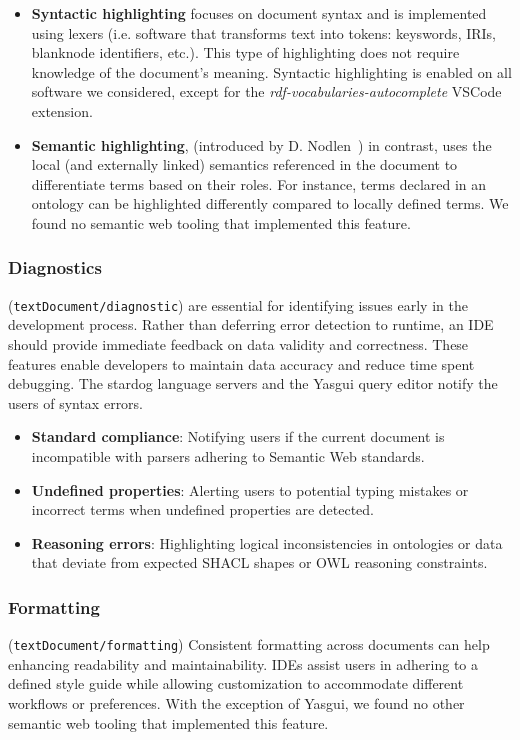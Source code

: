 \begin{itemize}
    \item \textbf{Syntactic highlighting} focuses on document syntax and is implemented using lexers (i.e. software that transforms text into tokens: keyswords, IRIs, blanknode identifiers, etc.).
      This type of highlighting does not require knowledge of the document's meaning.
      Syntactic highlighting is enabled on all software we considered, except for the 
      \textit{rdf-vocabularies-autocomplete} VSCode extension.
    \item \textbf{Semantic highlighting}, (introduced by D. Nodlen~\cite{DNolden}) in contrast, uses the local (and externally linked) semantics referenced in the document to differentiate terms based on their roles. 
      For instance, terms declared in an ontology can be highlighted differently compared to locally defined terms.
      We found no semantic web tooling that implemented this feature.
\end{itemize}


\subsubsection{Diagnostics} (\texttt{textDocument/diagnostic}) are essential for identifying issues early in the development process. 
Rather than deferring error detection to runtime, an IDE should provide immediate feedback on data validity and correctness.
These features enable developers to maintain data accuracy and reduce time spent debugging. 
The stardog language servers and the Yasgui query editor notify the users of syntax errors.

\begin{itemize}
    \item \textbf{Standard compliance}: Notifying users if the current document is incompatible with parsers adhering to Semantic Web standards.
    \item \textbf{Undefined properties}: Alerting users to potential typing mistakes or incorrect terms when undefined properties are detected.
    \item \textbf{Reasoning errors}: Highlighting logical inconsistencies in ontologies or data that deviate from expected SHACL shapes or OWL reasoning constraints.
\end{itemize}


\subsubsection{Formatting} (\texttt{textDocument/formatting})
Consistent formatting across documents can help enhancing readability and maintainability.
IDEs assist users in adhering to a defined style guide while allowing customization to accommodate different workflows or preferences.
With the exception of Yasgui, we found no other semantic web tooling that implemented this feature.


